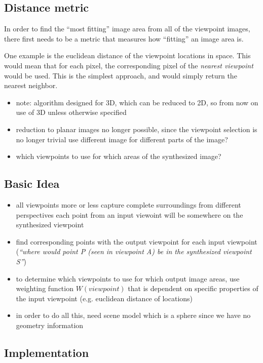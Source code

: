 \subsection{Distance metric}
In order to find the ``most fitting'' image area from all of the viewpoint images, there first needs to be a metric that measures how ``fitting'' an image area is. 

One example is the euclidean distance of the viewpoint locations in space. This would mean that for each pixel, the corresponding pixel of the \emph{nearest viewpoint} would be used. This is the simplest approach, and would simply return the nearest neighbor. 

\begin{itemize}
    \item note: algorithm designed for 3D, which can be reduced to 2D, so from now on use of 3D unless otherwise specified
    \item reduction to planar images no longer possible, since the viewpoint selection is no longer trivial \ar use different image for different parts of the image?
    \item which viewpoints to use for which areas of the synthesized image?
\end{itemize}

\subsection{Basic Idea}



\begin{itemize}
    \item all viewpoints more or less capture complete surroundings from different perspectives \ar each point from an input viewoint will be somewhere on the synthesized viewpoint
    \item find corresponding points with the output viewpoint for each input viewpoint (\emph{``where would point P (seen in viewpoint A) be in the synthesized viewpoint S''})
    \item to determine which viewpoints to use for which output image areas, use weighting function $W(viewpoint)$ that is dependent on specific properties of the input viewpoint (e.g. euclidean distance of locations)
    \item in order to do all this, need scene model which is a sphere since we have no geometry information
\end{itemize}

\subsection{Implementation}

